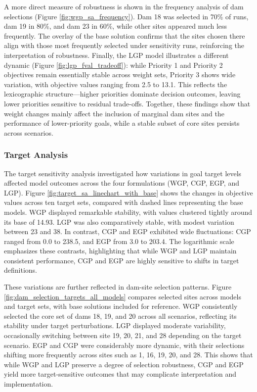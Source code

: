 A more direct measure of robustness is shown in the frequency analysis of dam selections (Figure \ref{fig:wgp_sa_frequency}). Dam 18 was selected in 70\% of runs, dam 19 in 80\%, and dam 23 in 60\%, while other sites appeared much less frequently. The overlay of the base solution confirms that the sites chosen there align with those most frequently selected under sensitivity runs, reinforcing the interpretation of robustness. Finally, the LGP model illustrates a different dynamic (Figure \ref{fig:lgp_fval_tradeoff}): while Priority 1 and Priority 2 objectives remain essentially stable across weight sets, Priority 3 shows wide variation, with objective values ranging from 2.5 to 13.1. This reflects the lexicographic structure—higher priorities dominate decision outcomes, leaving lower priorities sensitive to residual trade-offs. Together, these findings show that weight changes mainly affect the inclusion of marginal dam sites and the performance of lower-priority goals, while a stable subset of core sites persists across scenarios.







\subsubsection{Target Analysis}
The target sensitivity analysis investigated how variations in goal target levels affected model outcomes across the four formulations (WGP, CGP, EGP, and LGP). Figure \ref{fig:target_sa_linechart_with_base} shows the changes in objective values across ten target sets, compared with dashed lines representing the base models. WGP displayed remarkable stability, with values clustered tightly around its base of 14.93. LGP was also comparatively stable, with modest variation between 23 and 38. In contrast, CGP and EGP exhibited wide fluctuations: CGP ranged from 0.0 to 238.5, and EGP from 3.0 to 203.4. The logarithmic scale emphasizes these contrasts, highlighting that while WGP and LGP maintain consistent performance, CGP and EGP are highly sensitive to shifts in target definitions.

These variations are further reflected in dam-site selection patterns. Figure \ref{fig:dam_selection_targets_all_models} compares selected sites across models and target sets, with base solutions included for reference. WGP consistently selected the core set of dams 18, 19, and 20 across all scenarios, reflecting its stability under target perturbations. LGP displayed moderate variability, occasionally switching between site 19, 20, 21, and 28 depending on the target scenario. EGP and CGP were considerably more dynamic, with their selections shifting more frequently across sites such as 1, 16, 19, 20, and 28. This shows that while WGP and LGP preserve a degree of selection robustness, CGP and EGP yield more target-sensitive outcomes that may complicate interpretation and implementation.


